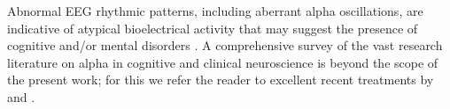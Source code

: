 \documentclass[12pt,twoside]{article}
\begin{document}
Abnormal EEG rhythmic patterns, including aberrant alpha oscillations, are indicative of atypical bioelectrical activity that may suggest the presence of cognitive and/or mental disorders \citep{scally2018resting, buchanan2021elevated, abela2019slower, fingelkurts2006composition, roohi2017changes, metzger2004ptsd, roohi2017changes}. %
A comprehensive survey of the vast research literature on alpha in cognitive and clinical neuroscience is beyond the scope of the present work; for this we refer the reader to excellent recent treatments by \citet{ippolito2022role} and \citet{bacsar2012short}.
\end{document}
